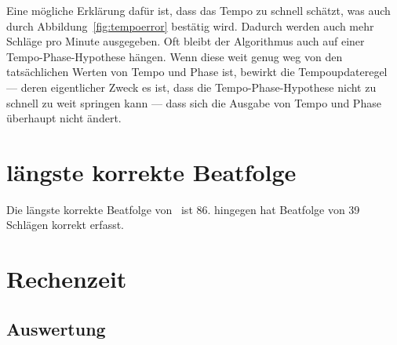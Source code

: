 {{		%
		Eine mögliche Erklärung dafür ist,
			dass \cite{2011_PlRoSt} das Tempo zu schnell schätzt,
			was auch durch Abbildung~\ref{fig:tempoerror} bestätig wird.
		Dadurch werden auch mehr Schläge pro Minute ausgegeben.
		Oft bleibt der Algorithmus auch auf einer Tempo-Phase-Hypothese hängen.
		Wenn diese weit genug weg von den tatsächlichen Werten von Tempo und Phase ist,
			bewirkt die Tempoupdateregel ---
			deren eigentlicher Zweck es ist,
			dass die Tempo-Phase-Hypothese nicht zu schnell zu weit springen kann ---
			dass sich die Ausgabe von Tempo und Phase überhaupt nicht ändert.
	}
}

\section{längste korrekte Beatfolge}
{
	Die längste korrekte Beatfolge von~\cite{2009_DaPlSt} ist \num{86}.
	\cite{2011_RoPlSt} hingegen hat Beatfolge von \num{39} Schlägen korrekt erfasst.
}

\section{Rechenzeit}
{
	{
	}

	\subsection{Auswertung}
	{
	}
}
